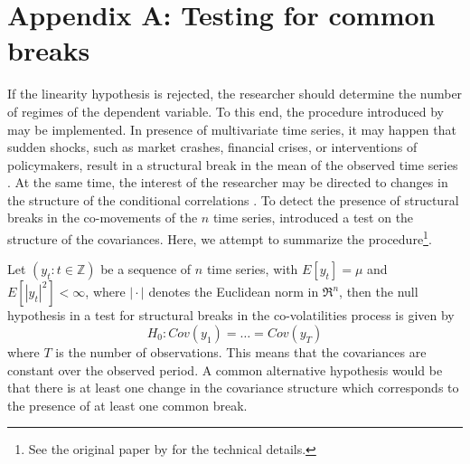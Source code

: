 \newpage


\newpage
\section{Appendix A: Testing for common breaks}\label{common}

If the linearity hypothesis is rejected, the researcher should determine the number of regimes of the dependent variable. To this end, the procedure introduced by \citet*{baipe98,baipe03} may be implemented. In presence of multivariate time series, it may happen that sudden shocks, such as market crashes, financial crises, or interventions of policymakers, result in a structural break in the mean of the observed time series \citep[see][]{stock1998}. At the same time, the interest of the researcher may be directed to changes in the structure of the conditional correlations \citep[see][]{bara2020, aue2009}. To detect the presence of structural breaks in the co-movements of the $n$ time series, \citet*{aue2009} introduced a test on the structure of the covariances. Here, we attempt to summarize the procedure\footnote{See the original paper by \citet*{aue2009} for the technical details.}.

Let $\left(y_t: t\in \mathbb{Z}\right)$ be a sequence of $n$ time series, with $E[y_t] = \mu$ and $E[| y_t|^2] < \infty$, where $\mid \cdot \mid$ denotes the Euclidean norm in $\Re^n$, then the null hypothesis in a test for structural breaks in the co-volatilities process is given by
\begin{equation*}
	H_0\colon Cov(y_1) = \ldots = Cov(y_T)
\end{equation*}
where $T$ is the number of observations. This means that the covariances are constant over the observed period. A common alternative hypothesis would be that there is at least one change in the covariance structure which corresponds to the presence of at least one common break.


